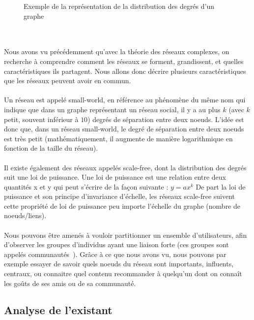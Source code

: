 \begin{titlepage}
{\begin{figure}[h]
\caption{Exemple de la représentation de la distribution des degrés d'un graphe}
\end{figure}
\\ \\ 
Nous avons vu précédemment qu'avec la théorie des réseaux complexes, on recherche à comprendre comment les réseaux se forment, grandissent, et quelles caractéristiques ils partagent. Nous allons donc décrire plusieurs caractéristiques que les réseaux peuvent avoir en commun.
\\ \\ 
Un réseau est appelé small-world, en référence au phénomène du même nom qui indique que dans un graphe représentant un réseau social, il y a au plus $k$ (avec $k$ petit, souvent inférieur à $10$) degrés de séparation entre deux noeuds. L'idée est donc que, dans un réseau small-world, le degré de séparation entre deux noeuds est très petit (mathématiquement, il augmente de manière logarithmique en fonction de la taille du réseau).
\\ \\ 
Il existe également des réseaux appelés scale-free, dont la distribution des degrés suit une loi de puissance. Une loi de puissance est une relation entre deux quantités x et y qui peut s'écrire de la façon suivante :
$ y = ax^k $
De part la loi de puissance et son principe d'invariance d'échelle, les réseaux scale-free suivent cette propriété de loi de puissance peu importe l'échelle du graphe (nombre de noeuds/liens).
\\ \\ 
Nous pouvons être amenés à vouloir partitionner un ensemble d'utilisateurs, afin d'observer les groupes d'individus ayant une liaison forte (ces groupes sont appelés communautés~\cite{communautes, structure}). Grâce à ce que nous avons vu, nous pouvons par exemple essayer de savoir quels noeuds du réseau sont importants, influents, centraux, ou connaitre quel contenu recommander à quelqu'un dont on connaît les goûts de ses amis ou de sa communauté.
}


\newpage
\begin{center}
\begin{bf}
\section{Analyse de l'existant}
\end{bf}
\end{center}


\end{titlepage}
